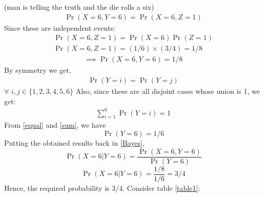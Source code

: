 \documentclass[journal,12pt,twocolumn]{IEEEtran}
\begin{document}
(man is telling the truth and the die rolls a six)
\begin{align*}
\Pr(X=6, Y=6)=\Pr(X=6, Z=1)
\end{align*}
Since these are independent events:
\begin{align}
\Pr(X=6, Z=1)=\Pr(X=6)\Pr(Z=1) \\
\Pr(X=6, Z=1)=(1/6) \times (3/4)=1/8
\end{align}
\begin{align*}
\implies \Pr(X=6, Y=6)=1/8 
\end{align*}
By symmetry we get, 
\begin{align}
   \Pr(Y=i) = \Pr(Y=j)
   \label{equal}
\end{align}
$\forall$ $i,j \in \{ 1,2,3,4,5,6 \}$ 
\newline Also, since these are all disjoint cases whose union is 1, we get:
\begin{align}
    \sum_{i=1}^{6} \Pr(Y=i) = 1 
    \label{sum}
\end{align}
From \eqref{equal} and \eqref{sum}, we have 
$$ \Pr(Y=6) = 1/6 $$
Putting the obtained results back in \eqref{Bayes},
$$\Pr(X=6|Y=6) = \frac{\Pr(X=6, Y=6)}{\Pr(Y=6)} $$
$$\Pr(X=6|Y=6) = \frac{1/8}{1/6} = 3/4$$
Hence, the required probability is 3/4.
\newline \newline Consider table \ref{table1}:
\begin{table}[h]
\centering
{}
\caption{Probabilities of random variables}
\label{table1}
\end{table}
\end{document}
